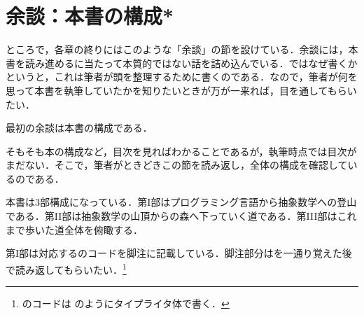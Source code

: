\documentclass[a5paper,twoside,fleqn,draft]{jsbook}
\begin{document}


\section{余談：本書の構成*}

ところで，各章の終りにはこのような「余談」の節を設けている．余談には，本書を読み進めるに当たって本質的ではない話を詰め込んでいる．ではなぜ書くかというと，これは筆者が頭を整理するために書くのである．なので，筆者が何を思って本書を執筆していたかを知りたいときが万が一来れば，目を通してもらいたい．

最初の余談は本書の構成である．

そもそも本の構成など，目次を見ればわかることであるが，執筆時点では目次がまだない．そこで，筆者がときどきこの節を読み返し，全体の構成を確認しているのである．

本書は3部構成になっている．第I部はプログラミング言語から抽象数学への登山である．第II部は抽象数学の山頂から\haskell の森へ下っていく道である．第III部はこれまで歩いた道全体を俯瞰する．

第I部は対応する\haskell のコードを脚注に記載している．脚注部分は\haskell を一通り覚えた後で読み返してもらいたい．\footnote{\haskell のコードは  のようにタイプライタ体で書く．}
\end{document}
